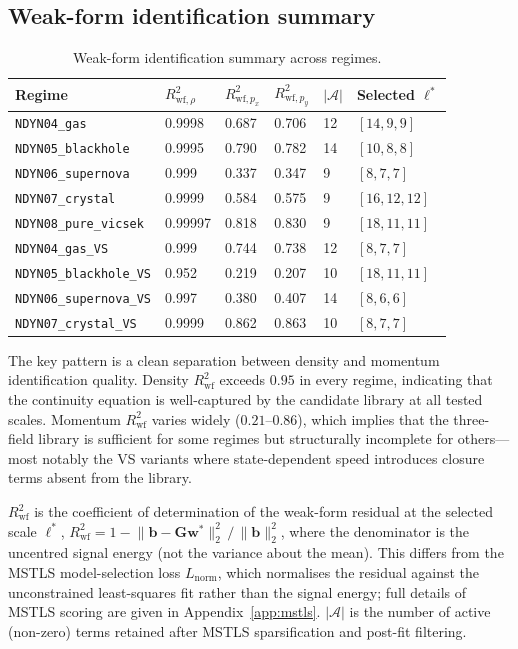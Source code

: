 \subsection{Weak-form identification summary}

\begin{table}[ht]
\centering
\caption{Weak-form identification summary across regimes.}
\label{tab:wsindy_regime_summary}
\renewcommand{\arraystretch}{0.95}
\small
\begin{tabular}{llllll}
\toprule
\textbf{Regime} & $R^2_{\text{wf},\rho}$ & $R^2_{\text{wf},p_x}$ & $R^2_{\text{wf},p_y}$ & $|\mathcal{A}|$ & Selected $\boldsymbol{\ell}^*$ \\
\midrule
\texttt{NDYN04\_gas} & 0.9998 & 0.687 & 0.706 & 12 & $[14,9,9]$ \\
\texttt{NDYN05\_blackhole} & 0.9995 & 0.790 & 0.782 & 14 & $[10,8,8]$ \\
\texttt{NDYN06\_supernova} & 0.999 & 0.337 & 0.347 & 9 & $[8,7,7]$ \\
\texttt{NDYN07\_crystal} & 0.9999 & 0.584 & 0.575 & 9 & $[16,12,12]$ \\
\texttt{NDYN08\_pure\_vicsek} & 0.99997 & 0.818 & 0.830 & 9 & $[18,11,11]$ \\
\midrule
\texttt{NDYN04\_gas\_VS} & 0.999 & 0.744 & 0.738 & 12 & $[8,7,7]$ \\
\texttt{NDYN05\_blackhole\_VS} & 0.952 & 0.219 & 0.207 & 10 & $[18,11,11]$ \\
\texttt{NDYN06\_supernova\_VS} & 0.997 & 0.380 & 0.407 & 14 & $[8,6,6]$ \\
\texttt{NDYN07\_crystal\_VS} & 0.9999 & 0.862 & 0.863 & 10 & $[8,7,7]$ \\
\bottomrule
\end{tabular}
\end{table}

\noindent
The key pattern is a clean separation between density and momentum
identification quality.  Density $R^2_{\text{wf}}$ exceeds $0.95$ in every
regime, indicating that the continuity equation is well-captured by the
candidate library at all tested scales.  Momentum $R^2_{\text{wf}}$ varies
widely ($0.21$--$0.86$), which implies that the three-field library is
sufficient for some regimes but structurally incomplete for others---most
notably the VS variants where state-dependent speed introduces closure
terms absent from the library.

$R^2_{\text{wf}}$ is the coefficient of determination of the
weak-form residual at the selected scale $\boldsymbol{\ell}^*$,
$R^2_{\mathrm{wf}} = 1 -
\lVert\mathbf{b} - \mathbf{G}\mathbf{w}^*\rVert_2^2\,/\,
\lVert\mathbf{b}\rVert_2^2$,
where the denominator is the uncentred signal energy (not the variance
about the mean).  This differs from the MSTLS model-selection loss
$L_{\mathrm{norm}}$, which normalises the residual against the
unconstrained least-squares fit rather than the signal energy;
full details of MSTLS scoring are given in Appendix~\ref{app:mstls}.
$|\mathcal{A}|$ is the number of active (non-zero) terms retained after
MSTLS sparsification and post-fit filtering.

